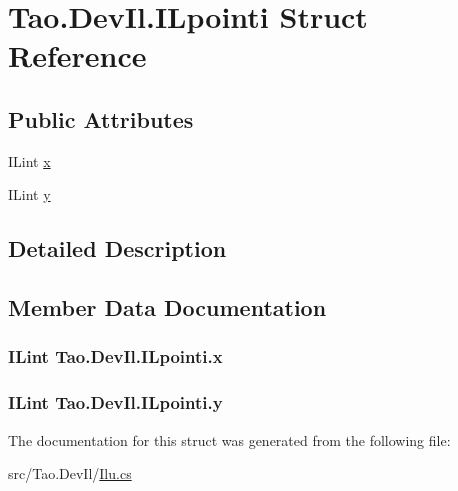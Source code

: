 \hypertarget{struct_tao_1_1_dev_il_1_1_i_lpointi}{
\section{Tao.DevIl.ILpointi Struct Reference}
\label{struct_tao_1_1_dev_il_1_1_i_lpointi}
}
\subsection*{Public Attributes}
\begin{DoxyCompactItemize}
\item 
ILint \hyperlink{struct_tao_1_1_dev_il_1_1_i_lpointi_a9b500ab4677a5b51c86fad1c95bf1e6c}{x}
\item 
ILint \hyperlink{struct_tao_1_1_dev_il_1_1_i_lpointi_afc0fdfd31022619704ccab4747490046}{y}
\end{DoxyCompactItemize}


\subsection{Detailed Description}


\subsection{Member Data Documentation}
\hypertarget{struct_tao_1_1_dev_il_1_1_i_lpointi_a9b500ab4677a5b51c86fad1c95bf1e6c}{
\subsubsection[{x}]{\setlength{\rightskip}{0pt plus 5cm}ILint {\bf Tao.DevIl.ILpointi.x}}}
\label{struct_tao_1_1_dev_il_1_1_i_lpointi_a9b500ab4677a5b51c86fad1c95bf1e6c}
\hypertarget{struct_tao_1_1_dev_il_1_1_i_lpointi_afc0fdfd31022619704ccab4747490046}{
\subsubsection[{y}]{\setlength{\rightskip}{0pt plus 5cm}ILint {\bf Tao.DevIl.ILpointi.y}}}
\label{struct_tao_1_1_dev_il_1_1_i_lpointi_afc0fdfd31022619704ccab4747490046}


The documentation for this struct was generated from the following file:\begin{DoxyCompactItemize}
\item 
src/Tao.DevIl/\hyperlink{_ilu_8cs}{Ilu.cs}\end{DoxyCompactItemize}
